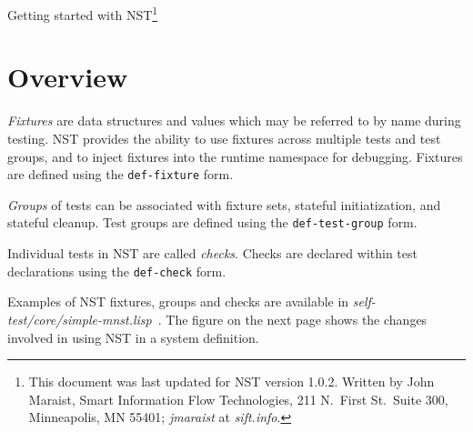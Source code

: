 \documentclass{article}
\begin{document}
\thispagestyle{empty}
\begin{center}
  \LARGE Getting started with NST\footnote{This document was last
    updated for NST version 1.0.2.  Written by John Maraist, Smart
    Information Flow Technologies, 211 N.\ First St.\ Suite 300,
    Minneapolis, MN 55401; \textsl{jmaraist} at \textsl{sift.info}.}
\end{center}

\section*{Overview}
\emph{Fixtures} are data structures and values which may be referred
to by name during testing.  NST provides the ability to use fixtures
across multiple tests and test groups, and to inject fixtures into the
runtime namespace for debugging.  Fixtures are defined using the
\texttt{def-fixture} form.

\emph{Groups} of tests can be associated with fixture sets, stateful
initiatization, and stateful cleanup.  Test groups are defined using
the \texttt{def-test-group} form.

Individual tests in NST are called \emph{checks}.  Checks are declared
within test declarations using the \texttt{def-check} form.

Examples of NST fixtures, groups and checks
are available in \textsl{self-test/core/simple-mnst.lisp}~.  The
figure on the next page shows the changes involved in using NST in a
system definition.
\end{document}
